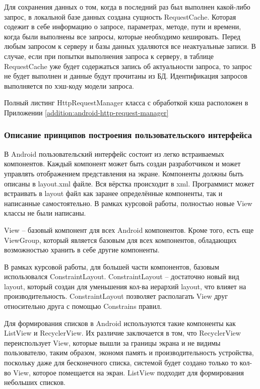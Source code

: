 Для сохранения данных о том, когда в последний раз был выполнен какой-либо запрос, в локальной базе данных создана сущность RequestCache.
Которая содежит в себе информацию о запросе, параметрах, методе, пути и времени, когда были выполнены все запросы, которые необходимо кешировать.
Перед любым запросом к серверу и базы данных удаляются все неактуальные записи.
В случае, если при попытки выполнения запроса к серверу, в таблице RequestCache уже будет содержаться запись об актуальности запроса, то запрос не будет выполнен и данные будут прочитаны из БД.
Идентификация запросов выполняется по хэш-коду модели запроса.

Полный листинг HttpRequestManager класса с обработкой кэша расположен в Приложении \ref{addition:android-http-request-manager}

\subsubsection{Описание принципов построения пользовательского интерфейса}\indent

В Android пользовательский интерфейс состоит из легко встраиваемых компонентов.
Каждый компонент может быть создан разработчиком и может управлять отображением представления на экране.
Компоненты должны быть описаны в layout.xml файле.
Вся вёрстка происходит в xml.
Программист может встраивать в layout файл как заранее определённые компоненты, так и написанные самостоятельно.
В рамках курсовой работы, полностью новые View классы не были написаны.

View – базовый компонент для всех Android компонентов.
Кроме того, есть еще ViewGroup, который является базовым для всех компонентов, обладающих возможностью хранить в себе другие компоненты.

В рамках курсовой работы, для большей части компонентов, базовым использовался ConstraintLayout.
ConstraintLayout – достаточно новый вид layout, который создан для уменьшения кол-ва иерархий layout, что влияет на производительность.
ConstraintLayout позволяет располагать View друг относительно друга с помощью Constrains правил.

Для формирования списков в Android используются такие компоненты как ListView и RecyclerView.
Их различие заключается в том, что RecyclerView переиспользует View, которые вышли за границы экрана и не видимы пользователю, таким образом, экономя память и производительность устройства, поскольку даже для бесконечного списка, системой будет создано только то кол-во View, которое помещается на экран.
ListView подходит для формирования небольших списков.

